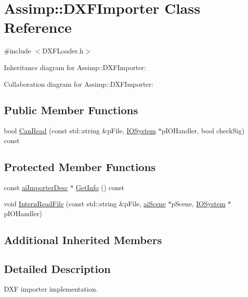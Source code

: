 \hypertarget{class_assimp_1_1_d_x_f_importer}{\section{Assimp\+:\+:D\+X\+F\+Importer Class Reference}
\label{class_assimp_1_1_d_x_f_importer}
}


{\ttfamily \#include $<$D\+X\+F\+Loader.\+h$>$}



Inheritance diagram for Assimp\+:\+:D\+X\+F\+Importer\+:


Collaboration diagram for Assimp\+:\+:D\+X\+F\+Importer\+:
\subsection*{Public Member Functions}
\begin{DoxyCompactItemize}
\item 
bool \hyperlink{class_assimp_1_1_d_x_f_importer_a77a344cd0c5576f9705aba80fbc56c0b}{Can\+Read} (const std\+::string \&p\+File, \hyperlink{class_assimp_1_1_i_o_system}{I\+O\+System} $\ast$p\+I\+O\+Handler, bool check\+Sig) const 
\end{DoxyCompactItemize}
\subsection*{Protected Member Functions}
\begin{DoxyCompactItemize}
\item 
const \hyperlink{structai_importer_desc}{ai\+Importer\+Desc} $\ast$ \hyperlink{class_assimp_1_1_d_x_f_importer_a88361f339160bc34dce8124d3bf4cd86}{Get\+Info} () const 
\item 
void \hyperlink{class_assimp_1_1_d_x_f_importer_a5e055b507cafc7fa1bf32b0697dd1160}{Intern\+Read\+File} (const std\+::string \&p\+File, \hyperlink{structai_scene}{ai\+Scene} $\ast$p\+Scene, \hyperlink{class_assimp_1_1_i_o_system}{I\+O\+System} $\ast$p\+I\+O\+Handler)
\end{DoxyCompactItemize}
\subsection*{Additional Inherited Members}


\subsection{Detailed Description}
D\+X\+F importer implementation. 

